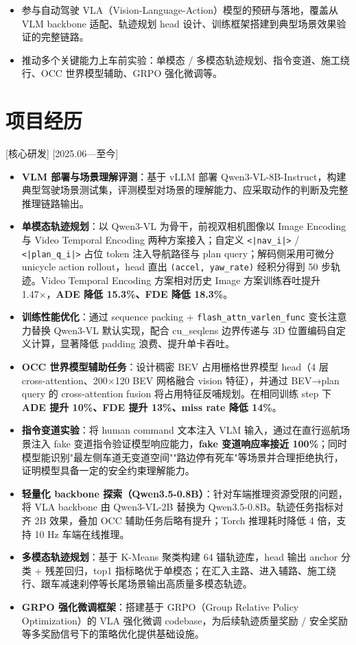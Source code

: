 \documentclass{resume}
\begin{document}
\begin{itemize}
  \item 参与自动驾驶 VLA（Vision-Language-Action）模型的预研与落地，覆盖从 VLM backbone 适配、轨迹规划 head 设计、训练框架搭建到典型场景效果验证的完整链路。
  \item 推动多个关键能力上车前实验：单模态 / 多模态轨迹规划、指令变道、施工绕行、OCC 世界模型辅助、GRPO 强化微调等。
\end{itemize}

\section{项目经历}

[核心研发] %
[2025.06—至今]

\begin{itemize}
  \item \textbf{VLM 部署与场景理解评测}：基于 vLLM 部署 Qwen3-VL-8B-Instruct，构建典型驾驶场景测试集，评测模型对场景的理解能力、应采取动作的判断及完整推理链路输出。
  \item \textbf{单模态轨迹规划}：以 Qwen3-VL 为骨干，前视双相机图像以 Image Encoding 与 Video Temporal Encoding 两种方案接入；自定义 \texttt{<|nav\_i|>} / \texttt{<|plan\_q\_i|>} 占位 token 注入导航路径与 plan query；解码侧采用可微分 unicycle action rollout，head 直出 \texttt{(accel, yaw\_rate)} 经积分得到 50 步轨迹。Video Temporal Encoding 方案相对历史 Image 方案训练吞吐提升 1.47×，\textbf{ADE 降低 15.3\%、FDE 降低 18.3\%}。
  \item \textbf{训练性能优化}：通过 sequence packing + \texttt{flash\_attn\_varlen\_func} 变长注意力替换 Qwen3-VL 默认实现，配合 cu\_seqlens 边界传递与 3D 位置编码自定义计算，显著降低 padding 浪费、提升单卡吞吐。
  \item \textbf{OCC 世界模型辅助任务}：设计稠密 BEV 占用栅格世界模型 head（4 层 cross-attention、200×120 BEV 网格融合 vision 特征），并通过 BEV→plan query 的 cross-attention fusion 将占用特征反哺规划。在相同训练 step 下 \textbf{ADE 提升 10\%、FDE 提升 13\%、miss rate 降低 14\%}。
  \item \textbf{指令变道实验}：将 human command 文本注入 VLM 输入，通过在直行巡航场景注入 fake 变道指令验证模型响应能力，\textbf{fake 变道响应率接近 100\%}；同时模型能识别"最左侧车道无变道空间""路边停有死车"等场景并合理拒绝执行，证明模型具备一定的安全约束理解能力。
  \item \textbf{轻量化 backbone 探索（Qwen3.5-0.8B）}：针对车端推理资源受限的问题，将 VLA backbone 由 Qwen3-VL-2B 替换为 Qwen3.5-0.8B。轨迹任务指标对齐 2B 效果，叠加 OCC 辅助任务后略有提升；Torch 推理耗时降低 4 倍，支持 10 Hz 车端在线推理。
  \item \textbf{多模态轨迹规划}：基于 K-Means 聚类构建 64 锚轨迹库，head 输出 anchor 分类 + 残差回归，top1 指标略优于单模态；在汇入主路、进入辅路、施工绕行、跟车减速刹停等长尾场景输出高质量多模态轨迹。
  \item \textbf{GRPO 强化微调框架}：搭建基于 GRPO（Group Relative Policy Optimization）的 VLA 强化微调 codebase，为后续轨迹质量奖励 / 安全奖励等多奖励信号下的策略优化提供基础设施。
\end{itemize}
\end{document}
